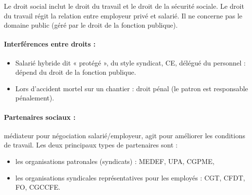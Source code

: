 Le droit social inclut le droit du travail et le droit de la sécurité sociale.
Le droit du travail régit la relation entre employeur privé et salarié.
Il ne concerne pas le domaine public (géré par le droit de la fonction publique).

\paragraph{Interférences entre droits :}
	\begin{itemize}
		\item[\textbullet] Salarié hybride dit « protégé », du style syndicat, CE, délégué du personnel : dépend du droit de la fonction publique.
		\item[\textbullet] Lors d’accident mortel sur un chantier : droit pénal (le patron est responsable pénalement).
	\end{itemize}

\paragraph{Partenaires sociaux :} médiateur pour négociation salarié/employeur, agit pour améliorer les conditions de travail.
	Les deux principaux types de partenaires sont :
	\begin{itemize}
		\item[\textbullet] les organisations patronales (syndicats) : MEDEF, UPA, CGPME,
		\item[\textbullet] les organisations syndicales représentatives pour les employés : CGT, CFDT, FO, CGCCFE.
	\end{itemize}
